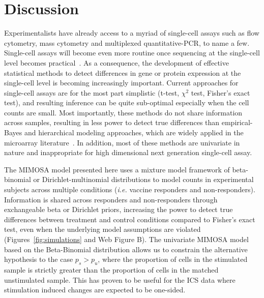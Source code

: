 \documentclass[useAMS,referee,usenatbib]{biom}
\begin{document}
\section{Discussion}
\label{s:discussion}
Experimentalists have already access to a myriad of single-cell assays such as flow cytometry, mass cytometry and multiplexed quantitative-PCR, to name a few. Single-cell assays will become even more routine once sequencing at the single-cell level becomes practical~\citep{Ramskold:2012gj}. As a consequence, the development of effective statistical methods to detect differences in gene or protein expression at the single-cell level is becoming increasingly important. Current approaches for single-cell assays are for the most part simplistic (t-test, $\chi^2$ test, Fisher's exact test), and resulting inference can be quite sub-optimal especially when the cell counts are small. Most importantly, these methods do not share information across samples, resulting in less power to detect true differences than empirical-Bayes and hierarchical modeling approaches, which are widely applied in the microarray literature~\citep{Kendziorski:2003uw,Newton:2001go,Smyth:2005iy}. In addition, most of these methods are univariate in nature and inappropriate for high dimensional next generation single-cell assay.

The MIMOSA model presented here uses a mixture model framework of beta-binomial or Dirichlet-multinomial distributions to model counts in experimental subjects across multiple conditions (\textit{i.e.} vaccine responders and non-responders). Information is shared across responders and non-responders through exchangeable beta or Dirichlet priors, increasing the power to detect true differences between treatment and control conditions compared to Fisher's exact test, even when the underlying model assumptions are violated (Figures~\ref{fig:simulations} and Web Figure B). The univariate MIMOSA model based on the Beta-Binomial distribution allows us to constrain the alternative hypothesis to the case $p_s > p_u$, where the proportion of cells in the stimulated sample is strictly greater than the proportion of cells in the matched unstimulated sample. This has proven to be useful for the ICS data where stimulation induced changes are expected to be one-sided.
\end{document}

